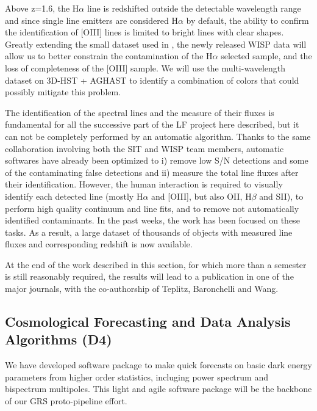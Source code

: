 Above z=1.6, the H$\alpha$ line is redshifted outside the detectable wavelength
range and since single line emitters are considered H$\alpha$ by default, the
ability to confirm the identification of [OIII] lines is limited to bright lines
with clear shapes. Greatly extending the small dataset used in
\citet{Colbert:2013ita}, the newly released WISP data will allow us to better
constrain the contamination of the H$\alpha$ selected sample, and the loss of
completeness of the [OIII] sample. We will use the multi-wavelength dataset on
3D-HST + AGHAST to identify a combination of colors that could possibly mitigate
this problem.

The identification of the spectral lines and the measure of their fluxes is
fundamental for all the successive part of the LF project here described, but it
can not be completely performed by an automatic algorithm. Thanks to the same
collaboration involving both the SIT and WISP team members, automatic softwares
have already been optimized to i) remove low S/N detections and some of the
contaminating false detections and ii) measure the total line fluxes after their
identification. However, the human interaction is required to visually identify
each detected line (mostly H$\alpha$ and [OIII], but also OII, H$\beta$ and
SII), to perform high quality continuum and line fits, and to remove not
automatically identified contaminants. In the past weeks, the work has been
focused on these tasks. As a result, a large dataset of thousands of objects
with measured line fluxes and corresponding redshift is now available.

At the end of the work described in this section, for which more than a semester
is still reasonably required, the results will lead to a publication in one of the
major journals, with the co-authorship of Teplitz, Baronchelli and Wang.


 \subsection{Cosmological Forecasting and Data Analysis Algorithms (D4)}
\label{sec:grs_algo}

 \begin{summaryii}
  We have developed software package to make quick forecasts on basic dark energy parameters from higher order statistics, incluging power spectrum and bispectrum multipoles. This light and agile software package will be the backbone of our GRS proto-pipeline effort.
  \end{summaryii}

